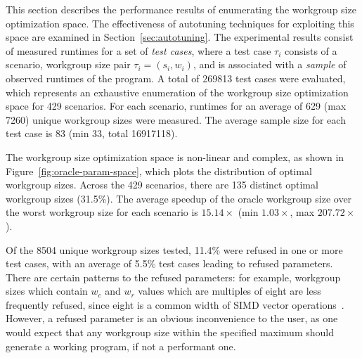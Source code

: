   This section describes the performance results of enumerating the workgroup size optimization space. The effectiveness of autotuning techniques for exploiting this space are examined in Section~\ref{sec:autotuning}. The experimental results consist of measured runtimes for a set of \emph{test cases}, where a test case $\tau_i$ consists of a scenario, workgroup size pair $\tau_i = (s_i,w_i)$, and is associated with a \emph{sample} of observed runtimes of the program. A total of 269813 test cases were evaluated, which represents an exhaustive enumeration of the workgroup size optimization space for 429 scenarios. For each scenario, runtimes for an average of 629 (max 7260) unique workgroup sizes were measured. The average sample size for each test case is 83 (min 33, total 16917118).

  The workgroup size optimization space is non-linear and complex, as shown in Figure~\ref{fig:oracle-param-space}, which plots the distribution of optimal workgroup sizes. Across the 429 scenarios, there are 135 distinct optimal workgroup sizes (31.5\%). The average speedup of the oracle workgroup size over the worst workgroup size for each scenario is $15.14\times$ (min $1.03\times$, max $207.72\times$).

  Of the 8504 unique workgroup sizes tested, 11.4\% were refused in one or more test cases, with an average of 5.5\% test cases leading to refused parameters. There are certain patterns to the refused parameters: for example, workgroup sizes which contain $w_c$ and $w_r$ values which are multiples of eight are less frequently refused, since eight is a common width of SIMD vector operations~\cite{IntelCorporation2012}. However, a refused parameter is an obvious inconvenience to the user, as one would expect that any workgroup size within the specified maximum should generate a working program, if not a performant one.


